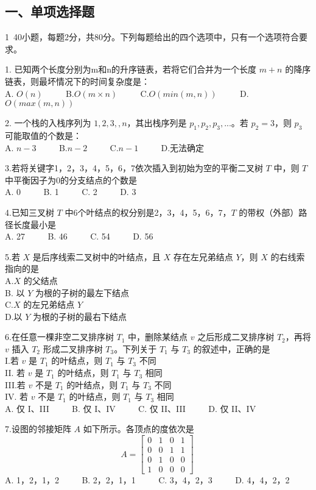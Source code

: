 
\subsection{一、单项选择题}
1~40小题，每题2分，共80分。下列每题给出的四个选项中，只有一个选项符合要求。

1. 已知两个长度分别为m和n的升序链表，若将它们合并为一个长度 $m+n$ 的降序链表，则最坏情况下的时间复杂度是： \\
A. $O(n)$ $\qquad$ B.$O(m \times n)$ $\qquad$ C.$O(min(m,n))$ $\qquad$ D.$O(max(m,n))$

2. 一个栈的入栈序列为 $1,2,3,,n$，其出栈序列是 $p_1, p_2, p_3, ...$。若 $p_2=3$，则 $p_3$ 可能取值的个数是： \\
A. $n-3$  $\qquad$  B.$n-2$ $\qquad$ C.$n-1$ $\qquad$ D.无法确定

3.若将关键字1，2，3，4，5，6，7依次插入到初始为空的平衡二叉树 $T$ 中，则 $T$ 中平衡因子为0的分支结点的个数是 \\
   A. 0 $\qquad$ B. 1 $\qquad$ C. 2 $\qquad$ D. 3

4.已知三叉树 $T$ 中6个叶结点的权分别是2，3，4，5，6，7，$T$ 的带权（外部）路径长度最小是 \\
   A. 27 $\qquad$ B. 46 $\qquad$ C. 54 $\qquad$ D. 56 

5.若 $X$ 是后序线索二叉树中的叶结点，且 $X$ 存在左兄弟结点 $Y$，则 $X$ 的右线索指向的是 \\
A.$X$ 的父结点 \\
B. 以 $Y$ 为根的子树的最左下结点 \\
C.$X$ 的左兄弟结点 $Y$ \\
D.以 $Y$ 为根的子树的最右下结点

6.在任意一棵非空二叉排序树 $T_1$ 中，删除某结点 $v$ 之后形成二叉排序树 $T_2$，再将 $v$ 插入 $T_2$ 形成二叉排序树 $T_3$。下列关于 $T_1$ 与 $T_3$ 的叙述中，正确的是  \\
I.若 $v$ 是 $T_1$ 的叶结点，则 $T_1$ 与 $T_3$ 不同 \\
II.	若 $v$ 是 $T_1$ 的叶结点，则 $T_1$ 与 $T_3$ 相同 \\
III.若 $v$ 不是 $T_1$ 的叶结点，则 $T_1$ 与 $T_3$ 不同 \\
IV.	若 $v$ 不是 $T_1$ 的叶结点，则 $T_1$ 与 $T_3$ 相同 \\
A. 仅 I、III $\qquad$ B. 仅 I、IV $\qquad$ C. 仅 II、III $\qquad$ D. 仅 II、IV

7.设图的邻接矩阵 $A$ 如下所示。各顶点的度依次是 \\
\begin{equation}
A=\begin{bmatrix}
0 & 1 & 0 & 1 \\
0 & 0 & 1 & 1 \\
0 & 1 & 0 & 0 \\
1 & 0 & 0 & 0
\end{bmatrix}
~
\end{equation}
A. 1，2，1，2 $\qquad$ B. 2，2，1，1 $\qquad$ C. 3，4，2，3 $\qquad$ D. 4，4，2，2

